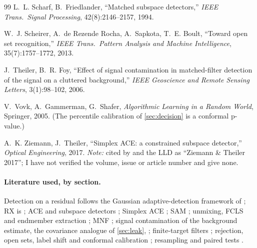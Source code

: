 \documentclass[11pt,a4paper]{article}
\theoremstyle{plain}
\theoremstyle{definition}
\theoremstyle{remark}
\begin{document}
\begin{thebibliography}{99}
 L.~L. Scharf, B.~Friedlander, ``Matched subspace detectors,'' \emph{IEEE Trans.\ Signal Processing},
42(8):2146--2157, 1994.

 W.~J. Scheirer, A.~de Rezende Rocha, A.~Sapkota, T.~E. Boult, ``Toward open set recognition,'' \emph{IEEE Trans.\ Pattern
Analysis and Machine Intelligence}, 35(7):1757--1772, 2013.

 J.~Theiler, B.~R. Foy, ``Effect of signal contamination in matched-filter detection of the signal on a cluttered
background,'' \emph{IEEE Geoscience and Remote Sensing Letters}, 3(1):98--102, 2006.

 V.~Vovk, A.~Gammerman, G.~Shafer, \emph{Algorithmic Learning in a Random World}, Springer, 2005. (The percentile calibration
of \cref{sec:decision} is a conformal p-value.)

 A.~K. Ziemann, J.~Theiler, ``Simplex ACE: a constrained subspace detector,'' \emph{Optical Engineering}, 2017.
\emph{Note:} cited by  and the LLD as ``Ziemann \& Theiler 2017''; I have not verified the volume, issue or article
number and give none.

\end{thebibliography}

\paragraph{Literature used, by section.} Detection on a residual follows the Gaussian adaptive-detection framework of
\cite{Kelly1986,Robey1992,ManolakisShaw2002,Manolakis2003,Manolakis2016,Kay1993}; RX is \cite{ReedYu1990}; ACE and subspace detectors
\cite{KrautScharf1999,KrautScharfMcWhorter2001,ScharfFriedlander1994}; Simplex ACE \cite{ZiemannTheiler2017}; SAM \cite{Kruse1993}; unmixing,
FCLS and endmember extraction \cite{KeshavaMustard2002,HeinzChang2001,NascimentoBioucas2005}; MNF \cite{Green1988}; signal contamination of the
background estimate, the covariance analogue of \cref{sec:leak}, \cite{TheilerFoy2006}; finite-target filters \cite{DiPietro2012}; rejection,
open sets, label shift and conformal calibration \cite{Chow1970,Scheirer2013,Saerens2002,Vovk2005}; resampling and paired tests
\cite{Efron1993,McNemar1947}.
\end{document}
